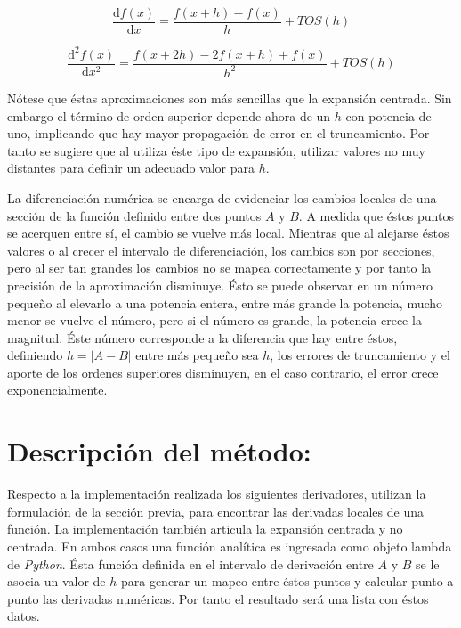 \documentclass[letterpaper,10pt,oneside]{sphinxmanual}
\theoremstyle{plain}%
\theoremstyle{definition}%
\theoremstyle{remark}%
\begin{document}
\begin{equation}
\frac{\mathrm{d}f(x)}{\mathrm{d}x} = \frac{f(x + h) -  f(x)}{h} + TOS(h)
\end{equation}

\begin{equation}
\frac{\mathrm{d}^{2}f(x)}{\mathrm{d}x^{2}} = \frac{f(x + 2h) -  2f(x + h) + f(x)}{h^2} + TOS(h)
\end{equation}

Nótese que éstas aproximaciones son más sencillas que la expansión centrada. Sin embargo el término de orden superior depende ahora de un $h$ con potencia de uno, implicando que hay mayor propagación de error en el truncamiento. Por tanto se sugiere que al utiliza éste tipo de expansión, utilizar valores no muy distantes para definir un adecuado valor para $h$.

La diferenciación numérica se encarga de evidenciar los cambios locales de una sección de la función definido entre dos puntos $A$ y $B$. A medida que éstos puntos se acerquen entre sí, el cambio se vuelve más local. Mientras que al alejarse éstos valores o al crecer el intervalo de diferenciación, los cambios son por secciones, pero al ser tan grandes los cambios no se mapea correctamente y por tanto la precisión de la aproximación disminuye. Ésto se puede observar en un número pequeño al elevarlo a una potencia entera, entre más grande la potencia, mucho menor se vuelve el número, pero si el número es grande, la potencia crece la magnitud. Éste número corresponde a la diferencia que hay entre éstos, definiendo $h = |A-B|$ entre más pequeño sea $h$, los errores de truncamiento y el aporte de los ordenes superiores disminuyen, en el caso contrario, el error crece exponencialmente.


\section{Descripción del método:}
\label{chapter04:descripción-del-método}

Respecto a la implementación realizada los siguientes derivadores, utilizan la formulación de la sección previa, para encontrar las derivadas locales de una función. La implementación también articula la expansión centrada y no centrada. En ambos casos una función analítica es ingresada como objeto lambda de \textit{Python}. Ésta función definida en el intervalo de derivación entre $A$ y $B$ se le asocia un valor de $h$ para generar un mapeo entre éstos puntos y calcular punto a punto las derivadas numéricas. Por tanto el resultado será una lista con éstos datos.
\end{document}
